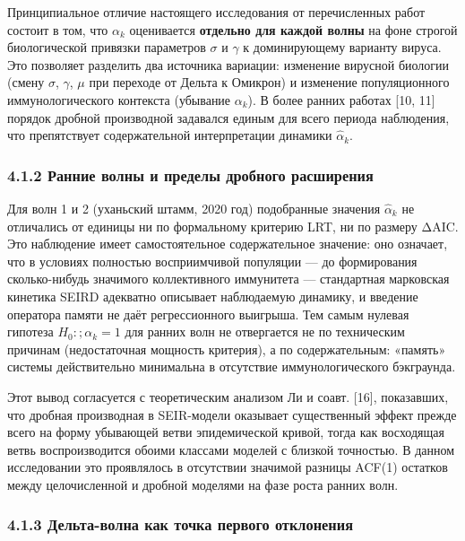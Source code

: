 \documentclass[12pt]{article}
\begin{document}
Принципиальное отличие настоящего исследования от перечисленных работ
состоит в том, что \(\alpha_k\) оценивается \textbf{отдельно для каждой
волны} на фоне строгой биологической привязки параметров \(\sigma\) и
\(\gamma\) к доминирующему варианту вируса. Это позволяет разделить два
источника вариации: изменение вирусной биологии (смену \(\sigma\),
\(\gamma\), \(\mu\) при переходе от Дельта к Омикрон) и изменение
популяционного иммунологического контекста (убывание \(\alpha_k\)). В
более ранних работах {[}10, 11{]} порядок дробной производной задавался
единым для всего периода наблюдения, что препятствует содержательной
интерпретации динамики \(\hat{\alpha}_k\).

\subsubsection{4.1.2 Ранние волны и пределы дробного
расширения}\label{ux440ux430ux43dux43dux438ux435-ux432ux43eux43bux43dux44b-ux438-ux43fux440ux435ux434ux435ux43bux44b-ux434ux440ux43eux431ux43dux43eux433ux43e-ux440ux430ux441ux448ux438ux440ux435ux43dux438ux44f}

Для волн 1 и 2 (уханьский штамм, 2020 год) подобранные значения
\(\hat{\alpha}_k\) не отличались от единицы ни по формальному критерию
LRT, ни по размеру ΔAIC. Это наблюдение имеет самостоятельное
содержательное значение: оно означает, что в условиях полностью
восприимчивой популяции --- до формирования сколько-нибудь значимого
коллективного иммунитета --- стандартная марковская кинетика SEIRD
адекватно описывает наблюдаемую динамику, и введение оператора памяти не
даёт регрессионного выигрыша. Тем самым нулевая гипотеза
\(H_0{:}; \alpha_k = 1\) для ранних волн не отвергается не по
техническим причинам (недостаточная мощность критерия), а по
содержательным: «память» системы действительно минимальна в отсутствие
иммунологического бэкграунда.

Этот вывод согласуется с теоретическим анализом Ли и соавт. {[}16{]},
показавших, что дробная производная в SEIR-модели оказывает существенный
эффект прежде всего на форму убывающей ветви эпидемической кривой, тогда
как восходящая ветвь воспроизводится обоими классами моделей с близкой
точностью. В данном исследовании это проявлялось в отсутствии значимой
разницы ACF(1) остатков между целочисленной и дробной моделями на фазе
роста ранних волн.

\subsubsection{4.1.3 Дельта-волна как точка первого
отклонения}\label{ux434ux435ux43bux44cux442ux430-ux432ux43eux43bux43dux430-ux43aux430ux43a-ux442ux43eux447ux43aux430-ux43fux435ux440ux432ux43eux433ux43e-ux43eux442ux43aux43bux43eux43dux435ux43dux438ux44f}
\end{document}
